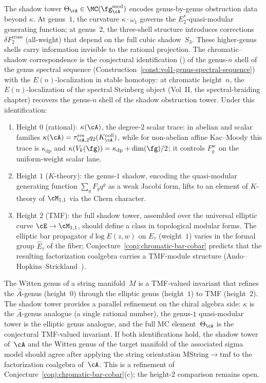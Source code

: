 \begin{remark}
The shadow tower $\Theta_\cA \in \MC(\fg^{\mathrm{mod}}_\cA)$
encodes genus-by-genus obstruction data beyond $\kappa$.
At genus~$1$, the curvature $\kappa \cdot \omega_1$ governs the
$E_2^*$-quasi-modular generating function; at genus~$2$,
the three-shell structure introduces corrections
$\delta F_2^{\mathrm{cross}}$ (all-weight) that depend on the full
cubic shadow~$S_3$. These higher-genus shells carry information
invisible to the rational projection. The chromatic--shadow
correspondence is the conjectural identification
(\ClaimStatusConjectured) of the genus-$n$ shell of the genus
spectral sequence (Construction~\ref{const:vol1-genus-spectral-sequence})
with the $E(n)$-localization in stable homotopy: at chromatic
height~$n$, the $E(n)$-localization of the spectral Steinberg object
(Vol~II, the spectral-braiding chapter) recovers the genus-$n$ shell
of the shadow obstruction tower. Under this identification:
\begin{enumerate}[label=\textup{(\roman*)}]
\item Height $0$ (rational):
 $\kappa(\cA)$, the degree-$2$ scalar trace: in abelian and scalar
 families $\kappa(\cA)=\tau_{\cA,2}^{\mathrm{res}}
 q_2(K_\cA^{\mathrm{coll}})$, while for non-abelian affine
 Kac--Moody this trace is $\kappa_{\mathrm{dp}}$ and
 $\kappa(V_k(\fg))=\kappa_{\mathrm{dp}}+\dim(\fg)/2$; it controls
 $F_g^{\mathrm{sc}}$ on the uniform-weight scalar lane.
\item Height $1$ ($K$-theory):
 the genus-$1$ shadow, encoding the quasi-modular generating
 function $\sum_g F_g q^g$ as a weak Jacobi form, lifts to an
 element of $K$-theory of $\cM_{1,1}$ via the Chern character.
\item Height $2$ (TMF):
 the full shadow tower, assembled over the universal elliptic curve
 $\cE \to \cM_{1,1}$, should define a class in topological modular
 forms. The elliptic bar propagator $d\log E(z,w)$ on $E_\tau$
 (weight~$1$) varies in the formal group $\hat{E}_\tau$ of the fiber;
 Conjecture~\ref{conj:chromatic-bar-cobar} predicts that the
 resulting factorization coalgebra carries a TMF-module structure
 (Ando--Hopkins--Strickland~\cite{AHS01}).
\end{enumerate}
The Witten genus of a string manifold~$M$
is a TMF-valued invariant that refines the
$\hat{A}$-genus (height~$0$) through the elliptic genus
(height~$1$) to TMF (height~$2$).
The shadow tower provides a parallel refinement on the chiral
algebra side: $\kappa$ is the $\hat{A}$-genus analogue (a single
rational number), the genus-$1$ quasi-modular tower is the
elliptic genus analogue, and the full MC element~$\Theta_\cA$ is
the conjectural TMF-valued invariant.
If both identifications hold, the shadow tower
of~$\cA$ and the Witten genus of the target manifold of
the associated sigma model should agree after applying the
string orientation $\mathrm{MString} \to \mathrm{tmf}$
to the factorization coalgebra of~$\cA$.
This is a refinement of Conjecture~\ref{conj:chromatic-bar-cobar}(c);
the height-$2$ comparison remains open.
\end{remark}

